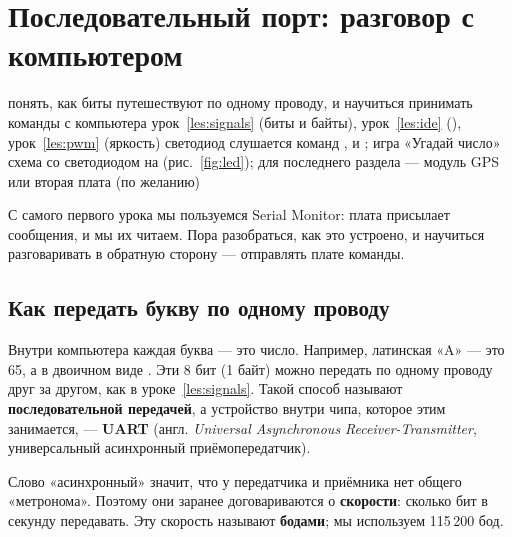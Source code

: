 \section{Последовательный порт: разговор с компьютером}
\label{les:serial}
\lessonintro
  {понять, как биты путешествуют по одному проводу, и научиться принимать команды с компьютера}
  {урок~\ref{les:signals} (биты и байты), урок~\ref{les:ide} (), урок~\ref{les:pwm} (яркость)}
  {светодиод слушается команд ,  и ; игра «Угадай число»}
  {схема со светодиодом на  (рис.~\ref{fig:led}); для последнего раздела --- модуль GPS или вторая плата (по желанию)}

С самого первого урока мы пользуемся Serial Monitor: плата присылает сообщения, и мы их читаем.
Пора разобраться, как это устроено, и научиться разговаривать в обратную сторону --- отправлять
плате команды.

\subsection{Как передать букву по одному проводу}

Внутри компьютера каждая буква --- это число. Например, латинская «A» --- это 65, а в двоичном виде
. Эти 8 бит (1 байт) можно передать по одному проводу друг за другом, как в
уроке~\ref{les:signals}. Такой способ называют \textbf{последовательной передачей}, а устройство внутри
чипа, которое этим занимается, --- \textbf{UART} (англ. \emph{Universal Asynchronous Receiver-Transmitter},
универсальный асинхронный приёмопередатчик).

Слово «асинхронный» значит, что у передатчика и приёмника нет общего «метронома». Поэтому они заранее
договариваются о \textbf{скорости}: сколько бит в секунду передавать. Эту скорость называют
\textbf{бодами}; мы используем 115\,200 бод.

